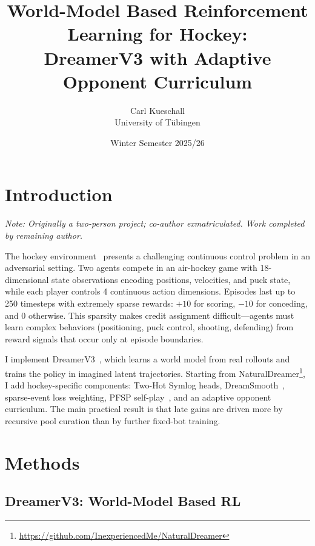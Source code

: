 \documentclass[11pt]{article}
\title{World-Model Based Reinforcement Learning for Hockey:\\
        DreamerV3 with Adaptive Opponent Curriculum}
\author{Carl Kueschall\\
        University of T\"ubingen}
\date{Winter Semester 2025/26}
\begin{document}
\maketitle

\section{Introduction}\label{sec:intro}

\textit{Note: Originally a two-person project; co-author exmatriculated. Work completed by remaining author.}

\medskip
The hockey environment~\cite{martius2024} presents a challenging continuous control problem in an adversarial setting. Two agents compete in an air-hockey game with 18-dimensional state observations encoding positions, velocities, and puck state, while each player controls 4 continuous action dimensions. Episodes last up to 250 timesteps with extremely sparse rewards: $+10$ for scoring, $-10$ for conceding, and $0$ otherwise. This sparsity makes credit assignment difficult---agents must learn complex behaviors (positioning, puck control, shooting, defending) from reward signals that occur only at episode boundaries.

I implement DreamerV3~\cite{hafner2024}, which learns a world model from real rollouts and trains the policy in imagined latent trajectories. Starting from NaturalDreamer\footnote{\url{https://github.com/InexperiencedMe/NaturalDreamer}}, I add hockey-specific components: Two-Hot Symlog heads, DreamSmooth~\cite{dreamsmooth2023}, sparse-event loss weighting, PFSP self-play~\cite{vinyals2019}, and an adaptive opponent curriculum. The main practical result is that late gains are driven more by recursive pool curation than by further fixed-bot training.


\section{Methods}\label{sec:method}

\subsection{DreamerV3: World-Model Based RL}\label{subsec:dreamer-method}
\end{document}

